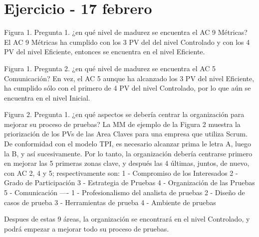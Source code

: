 \chapter{Ejercicio - 17 febrero}
\label{chap:ejercicio-17-febrero}


Figura 1. Pregunta 1. ¿en qué nivel de madurez se encuentra el AC 9 Métricas?
El AC 9 Métricas ha cumplido con los 3 PV del del nivel Controlado y con los 4 PV del nivel Eficiente, entonces se encuentra en el nivel Eficiente.

Figura 1. Pregunta 2. ¿en qué nivel de madurez se encuentra el AC 5 Comunicación?
En vez, el AC 5 aunque ha alcanzado los 3 PV del nivel Eficiente, ha cumplido sólo con el primero de 4 PV del nivel Controlado, por lo que aún se encuentra en el nivel Inicial.  

Figura 2. Pregunta 1. ¿en qué aspectos se debería centrar la organización para mejorar su proceso de pruebas?
La MM de ejemplo de la Figura 2 muestra la priorización de los PVs de las Area Claves para una empresa que utiliza Scrum. De conformidad con el modelo TPI, es necesario alcanzar prima le letra A, luego la B, y así sucesivamente. Por lo tanto, la organización debería centrarse primero en mejorar las 5 primeras zonas clave, y después las 4 últimas,  juntos, de nuevo, con AC 2, 4 y 5;
respectivamente son:
1 - Compromiso de los Interesados
2 - Grado de Participación
3 - Estrategia de Pruebas
4 - Organización de las Pruebas
5 - Comunicación
----
1 - Profesionalismo del analista de pruebas
2 - Diseño de casos de prueba
3 - Herramientas de prueba
4 - Ambiente de pruebas

Despues de estas 9 áreas, la organización se encontrará en el nivel Controlado, y podrá empezar a mejorar todo su proceso de pruebas.